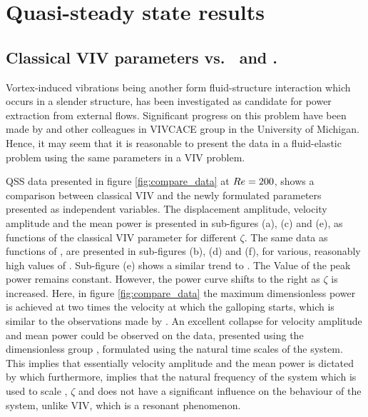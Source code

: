\section{Quasi-steady state results}
\label{sec:qss_results} 

\subsection{Classical VIV parameters vs. \massstiff \ and \massdamp.}
\label{subsec:compare_data}


Vortex-induced vibrations being another form fluid-structure interaction which occurs in a slender structure, has been investigated as candidate for power extraction from external flows. Significant progress on this problem have been made by \cite{Bernitsas2008a-concept,Bernitsas2009,Raghavan2010a,Lee2011b} and other colleagues in VIVCACE group in the University of Michigan. Hence, it may seem that it is reasonable to present the data in a fluid-elastic problem using the same parameters in a VIV problem.



QSS data presented in figure \ref{fig:compare_data} at $Re=200$, shows a comparison between classical VIV and the newly formulated parameters presented as independent variables. The displacement amplitude, velocity amplitude and the mean power is presented in sub-figures (a), (c) and (e), as functions of the classical VIV parameter \ustar for different $\zeta$. The same data as functions of \massdamp, are presented in sub-figures (b), (d) and (f), for various, reasonably high values of \massstiff {}. Sub-figure (e) shows a similar trend to \cite{Barrero-Gil2010a}. The Value of the peak power remains constant. However, the power curve shifts to the right as $\zeta$ is increased. Here, in figure \ref{fig:compare_data} the maximum dimensionless power is achieved at two times the velocity at which the galloping starts, which is similar to the observations made by \citet{Barrero-Gil2010a,vicente-Ludlam2014}. An excellent collapse for velocity amplitude and mean power could be observed on the data, presented using the dimensionless group \massdamp, formulated using the natural time scales of the system. This implies that essentially velocity amplitude and the mean power is dictated by \massdamp which furthermore, implies that the natural frequency of the system which is used to scale \ustar, $\zeta$ and \massstiff does not have a significant influence on the behaviour of the system, unlike VIV, which is a resonant phenomenon.  
 

